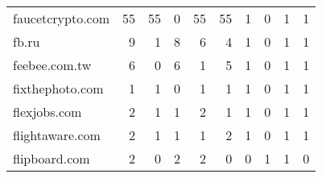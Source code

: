 \begin{tabular}{lrrrrrrrrr}
           faucetcrypto.com &                               55 &                                 55 &                                      0 &                           55 &                          55 &                                   1 &                                      0 &                             1 &                            1 \\
                      fb.ru &                                9 &                                  1 &                                      8 &                            6 &                           4 &                                   1 &                                      0 &                             1 &                            1 \\
              feebee.com.tw &                                6 &                                  0 &                                      6 &                            1 &                           5 &                                   1 &                                      0 &                             1 &                            1 \\
            fixthephoto.com &                                1 &                                  1 &                                      0 &                            1 &                           1 &                                   1 &                                      0 &                             1 &                            1 \\
               flexjobs.com &                                2 &                                  1 &                                      1 &                            2 &                           1 &                                   1 &                                      0 &                             1 &                            1 \\
            flightaware.com &                                2 &                                  1 &                                      1 &                            1 &                           2 &                                   1 &                                      0 &                             1 &                            1 \\
              flipboard.com &                                2 &                                  0 &                                      2 &                            2 &                           0 &                                   0 &                                      1 &                             1 &                            0 \\

\end{tabular}
